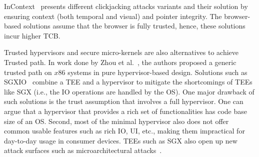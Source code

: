 
 InContext~\cite{huang2012clickjacking} presents different clickjacking attacks variants and their solution by ensuring context (both temporal and visual) and pointer integrity. The browser-based solutions assume that the browser is fully trusted, hence, these solutions incur higher TCB.


 Trusted hypervisors and secure micro-kernels are also alternatives to achieve Trusted path. In work done by Zhou et al.~\cite{zhou2012building}, the authors proposed a generic trusted path on $x86$ systems in pure hypervisor-based design. Solutions such as SGXIO~\cite{weiser2017sgxio}  combine a TEE and a hypervisor to mitigate the shortcomings of TEEs like SGX (i.e., the IO operations are handled by the OS). One major drawback of such solutions is the trust assumption that involves a full hypervisor. One can argue that a hypervisor that provides a rich set of functionalities has code base size of an OS. Second, most of the minimal hypervisor also does not offer common usable features such as rich IO, UI, etc., making them impractical for day-to-day usage in consumer devices. TEEs such as SGX also open up new attack surfaces such as microarchitectural attacks~\cite{van2018foreshadow}.

